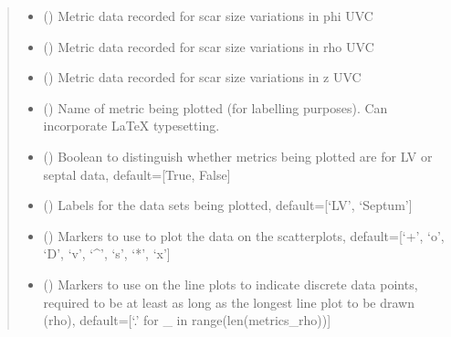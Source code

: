\documentclass[letterpaper,10pt,english]{sphinxmanual}
\begin{document}
\begin{fulllineitems}
\begin{quote}
\begin{description}
\begin{itemize}
\item {} 
\sphinxAtStartPar
{} () \textendash{} Metric data recorded for scar size variations in phi UVC

\item {} 
\sphinxAtStartPar
{} () \textendash{} Metric data recorded for scar size variations in rho UVC

\item {} 
\sphinxAtStartPar
{} () \textendash{} Metric data recorded for scar size variations in z UVC

\item {} 
\sphinxAtStartPar
{} () \textendash{} Name of metric being plotted (for labelling purposes). Can incorporate LaTeX typesetting.

\item {} 
\sphinxAtStartPar
{} (\sphinxstyleliteralemphasis{\sphinxupquote{, }}) \textendash{} Boolean to distinguish whether metrics being plotted are for LV or septal data, default={[}True, False{]}

\item {} 
\sphinxAtStartPar
{} (\sphinxstyleliteralemphasis{\sphinxupquote{, }}) \textendash{} Labels for the data sets being plotted, default={[}‘LV’, ‘Septum’{]}

\item {} 
\sphinxAtStartPar
{} (\sphinxstyleliteralemphasis{\sphinxupquote{, }}) \textendash{} Markers to use to plot the data on the scatterplots, default={[}‘+’, ‘o’, ‘D’, ‘v’, ‘\textasciicircum{}’, ‘s’, ‘*’, ‘x’{]}

\item {} 
\sphinxAtStartPar
{} (\sphinxstyleliteralemphasis{\sphinxupquote{, }}) \textendash{} Markers to use on the line plots to indicate discrete data points, required to be at least as long as
the longest line plot to be drawn (rho), default={[}‘.’ for \_ in range(len(metrics\_rho)){]}


\end{itemize}
\end{description}
\end{quote}
\end{fulllineitems}
\end{document}
